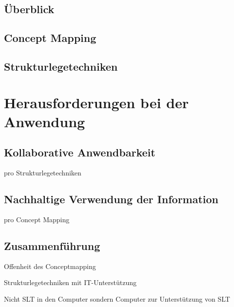 \subsection{Überblick}

\subsection{Concept Mapping}

\subsection{Strukturlegetechniken}

\section{Herausforderungen bei der Anwendung}
\label{sec:herausforderungen_bei_der_anwendung}

\subsection{Kollaborative Anwendbarkeit}

pro Strukturlegetechniken 

\subsection{Nachhaltige Verwendung der Information}

pro Concept Mapping

\subsection{Zusammenführung}

Offenheit des Conceptmapping

Strukturlegetechniken mit IT-Unterstützung

Nicht SLT in den Computer sondern Computer zur Unterstützung von SLT